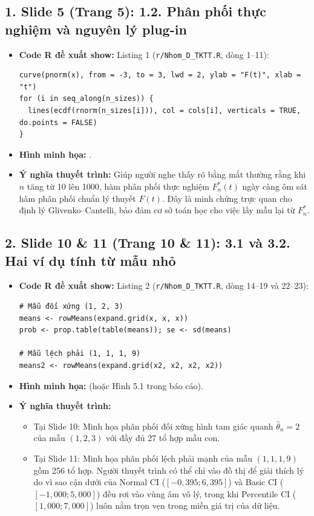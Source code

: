 \documentclass[10pt,a4paper]{article}
\begin{document}
\subsection*{1. Slide 5 (Trang 5): 1.2. Phân phối thực nghiệm và nguyên lý plug-in}
\begin{itemize}
    \item \textbf{Code R đề xuất show:} Listing 1 (\texttt{r/Nhom\_D\_TKTT.R}, dòng 1--11):
\begin{verbatim}
curve(pnorm(x), from = -3, to = 3, lwd = 2, ylab = "F(t)", xlab = "t")
for (i in seq_along(n_sizes)) {
  lines(ecdf(rnorm(n_sizes[i])), col = cols[i], verticals = TRUE, do.points = FALSE)
}
\end{verbatim}
    \item \textbf{Hình minh họa:} .
    \item \textbf{Ý nghĩa thuyết trình:} Giúp người nghe thấy rõ bằng mắt thường rằng khi $n$ tăng từ 10 lên 1000, hàm phân phối thực nghiệm $F_n^*(t)$ ngày càng ôm sát hàm phân phối chuẩn lý thuyết $F(t)$. Đây là minh chứng trực quan cho định lý Glivenko--Cantelli, bảo đảm cơ sở toán học cho việc lấy mẫu lại từ $F_n^*$.
\end{itemize}

\subsection*{2. Slide 10 \& 11 (Trang 10 \& 11): 3.1 và 3.2. Hai ví dụ tính từ mẫu nhỏ}
\begin{itemize}
    \item \textbf{Code R đề xuất show:} Listing 2 (\texttt{r/Nhom\_D\_TKTT.R}, dòng 14--19 và 22--23):
\begin{verbatim}
# Mẫu đối xứng (1, 2, 3)
means <- rowMeans(expand.grid(x, x, x))
prob <- prop.table(table(means)); se <- sd(means)

# Mẫu lệch phải (1, 1, 1, 9)
means2 <- rowMeans(expand.grid(x2, x2, x2, x2))
\end{verbatim}
    \item \textbf{Hình minh họa:}  (hoặc Hình 5.1 trong báo cáo).
    \item \textbf{Ý nghĩa thuyết trình:} 
    \begin{itemize}
        \item Tại Slide 10: Minh họa phân phối đối xứng hình tam giác quanh $\hat\theta_n = 2$ của mẫu $(1, 2, 3)$ với đầy đủ 27 tổ hợp mẫu con.
        \item Tại Slide 11: Minh họa phân phối lệch phải mạnh của mẫu $(1, 1, 1, 9)$ gồm 256 tổ hợp. Người thuyết trình có thể chỉ vào đồ thị để giải thích lý do vì sao cận dưới của Normal CI ($[-0{,}395; 6{,}395]$) và Basic CI ($[-1{,}000; 5{,}000]$) đều rơi vào vùng âm vô lý, trong khi Percentile CI ($[1{,}000; 7{,}000]$) luôn nằm trọn vẹn trong miền giá trị của dữ liệu.
    \end{itemize}
\end{itemize}
\end{document}
